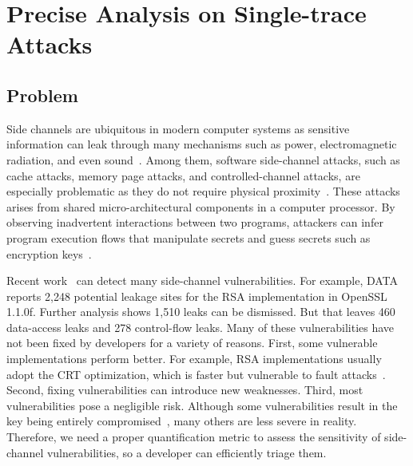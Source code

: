 
\chapter{Precise Analysis on Single-trace Attacks}\label{chapter4}

\section{Problem}
Side channels are ubiquitous in modern computer systems as sensitive
information can leak through many mechanisms such as power,
electromagnetic radiation, and even
sound~\cite{agrawal2002side,kar20178,chari1999towards,217605,genkin2014rsa}.
Among them, software side-channel attacks, such as cache attacks, memory page
attacks, and controlled-channel attacks, are especially problematic as they do not require physical proximity~\cite{7163052,217543,217589,lee2017inferring,191010,liu2015last}. These
attacks arises from shared micro-architectural components in a computer processor.
By observing inadvertent interactions between two programs, attackers can infer program
execution flows that manipulate secrets and guess secrets such as encryption
keys~\cite{Osvik2006,Gullasch:2011:CGB:2006077.2006784,203878,10.1007/978-3-540-45238-6_6}.


Recent work~\cite{203878,217537,Wichelmann:2018:MFF:3274694.3274741,Brotzman19Casym,236338,182946}
can detect many side-channel vulnerabilities. For example,
DATA~\cite{217537} reports 2,248 potential leakage sites for the RSA
implementation in OpenSSL 1.1.0f\@.
Further analysis shows 1,510 leaks can be dismissed. But that
leaves 460 data-access leaks and 278 control-flow leaks.
Many of these vulnerabilities have not been fixed by developers for a variety of reasons.
First, some vulnerable implementations perform better. For example,
RSA implementations usually adopt the CRT optimization,
which is faster but vulnerable to fault attacks~\cite{aumuller2002fault}.
Second, fixing vulnerabilities can introduce new
weaknesses.
Third, most vulnerabilities pose a negligible risk.
Although some vulnerabilities result in the key being
entirely compromised~\cite{184415, aumuller2002fault},
many others are less
severe in reality. Therefore, we need a proper quantification metric to
assess the sensitivity of side-channel vulnerabilities,
so a developer can efficiently triage them.

